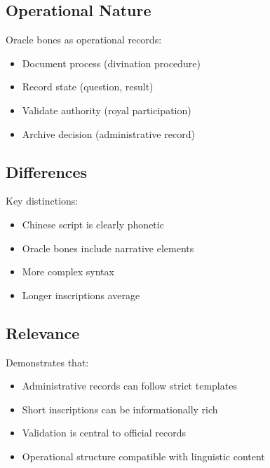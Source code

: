 \subsection{Operational Nature}

Oracle bones as operational records:
\begin{itemize}
    \item Document process (divination procedure)
    \item Record state (question, result)
    \item Validate authority (royal participation)
    \item Archive decision (administrative record)
\end{itemize}

\subsection{Differences}

Key distinctions:
\begin{itemize}
    \item Chinese script is clearly phonetic
    \item Oracle bones include narrative elements
    \item More complex syntax
    \item Longer inscriptions average
\end{itemize}

\subsection{Relevance}

Demonstrates that:
\begin{itemize}
    \item Administrative records can follow strict templates
    \item Short inscriptions can be informationally rich
    \item Validation is central to official records
    \item Operational structure compatible with linguistic content
\end{itemize}

